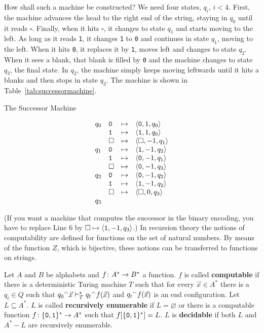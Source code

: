 How shall such a machine be constructed? We need four states,
$q_i$, $i < 4$. First, the machine advances the head to the right
end of the string, staying in $q_0$ until it reads $\square$.
Finally, when it hits $\square$, it changes to state $q_1$
and starts moving to the left. As long as it reads {\tt 1},
it changes {\tt 1} to {\tt 0} and continues in state $q_1$,
moving to the left. When it hits {\tt 0}, it replaces it by
{\tt 1}, moves left and changes to state $q_2$. When it sees
a blank, that blank is filled by {\tt 0} and the machine
changes to state $q_3$, the final state. In $q_2$, the machine
simply keeps moving leftwards until it hits a blanks and then
stops in state $q_3$. The machine is shown in
Table~\ref{tab:successormachine}.
\begin{table}
\caption{The Successor Machine}
\label{tab:successormachine}
$$\begin{array}{ll@{\quad\mapsto\quad}l}
q_0 & \mbox{\tt 0} & \auf \mbox{\tt 0}, 1, q_0\zu \\
    & \mbox{\tt 1} & \auf \mbox{\tt 1}, 1, q_0\zu \\
    & \square      & \auf \square, -1, q_1\zu \\
q_1 & \mbox{\tt 0} & \auf \mbox{\tt 1}, -1, q_2\zu \\
    & \mbox{\tt 1} & \auf \mbox{\tt 0}, -1, q_1\zu \\
    & \square      & \auf \mbox{\tt 0}, -1, q_3\zu \\
q_2 & \mbox{\tt 0} & \auf \mbox{\tt 0}, -1, q_2\zu \\
    & \mbox{\tt 1} & \auf \mbox{\tt 1}, -1, q_2\zu \\
    & \square      & \auf \square, 0, q_3\zu \\
q_3 & \multicolumn{2}{c}{}
\end{array}$$
\end{table}
(If you want a machine that computes the successor in the binary 
encoding, you have to replace Line 6 by 
$\square \mapsto \langle \mbox{\tt 1}, -1, q_3\rangle$.)
In recursion theory the notions of computability are defined
for functions on the set of natural numbers. By means of the
function $Z$, which is bijective, these notions can be
transferred to functions on strings.
\begin{defn}
Let $A$ and $B$ be alphabets and $f \colon A^{\ast} \rightarrow B^{\ast}$ a 
function. $f$ is called \textbf{computable} if there is a
deterministic Turing machine $T$ such that for every
$\vec{x} \in A^{\ast}$ there is a $q_t \in Q$ such that 
$q_0 {^{\smallfrown}} \vec{x} \vdash_T^{\ast} q_t {^{\smallfrown}} f(\vec{x})$ 
and $q_t {^{\smallfrown}} f(\vec{x})$ is
an end configuration. Let $L \subseteq A^{\ast}$. $L$
is called \textbf{recursively enumerable} 
if $L = \varnothing$ or
there is a computable function $f \colon \{\mbox{\tt 0},
\mbox{\tt 1}\}^{\ast} \rightarrow A^{\ast}$ such that
$f[\{\mbox{\tt 0}, \mbox{\tt 1}\}^{\ast}] = L$.
$L$ is \textbf{decidable} if both $L$ and $A^{\ast} - L$ are 
recursively enumerable.
\end{defn}
